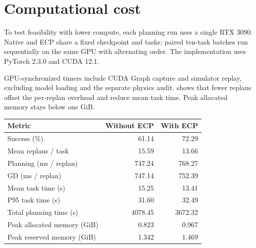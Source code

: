 \par
\noindent \begin{minipage}[t]{\columnwidth}
\vspace{0pt}
\section{Computational cost}
\label{sec:cost}
To test feasibility with lower compute, each planning run uses a single RTX 3090. Native and ECP share a fixed checkpoint and tasks; paired ten-task batches run sequentially on the same GPU with alternating order. The implementation uses PyTorch 2.3.0 and CUDA 12.1.\par\smallskip
\normalsize
GPU-synchronized timers include CUDA Graph capture and simulator replay, excluding model loading and the separate physics audit.  shows that fewer replans offset the per-replan overhead and reduce mean task time. Peak allocated memory stays below one GiB.\par

\end{minipage}\hfill
\begin{minipage}[t]{\columnwidth}
\vspace{0pt}
\par\smallskip
{\centering
\centering
{}
\label{tab:cost}
\small
\setlength{\tabcolsep}{3.5pt}
\begin{tabular*}{\columnwidth}{@{\extracolsep{\fill}}lrr@{}}
\toprule
Metric & Without ECP & With ECP\\
\midrule
Success (\%) &61.14&72.29\\
Mean replans / task &15.59&13.66\\
Planning (ms / replan) &747.24&768.27\\
GD (ms / replan) &747.14&752.39\\
Mean task time (s) &15.25&13.41\\
P95 task time (s) &31.60&32.49\\
Total planning time (s) &4078.45&3672.32\\
Peak allocated memory (GiB) &0.823&0.967\\
Peak reserved memory (GiB) &1.342&1.469\\
\bottomrule
\end{tabular*}

\par}

\end{minipage}\par
